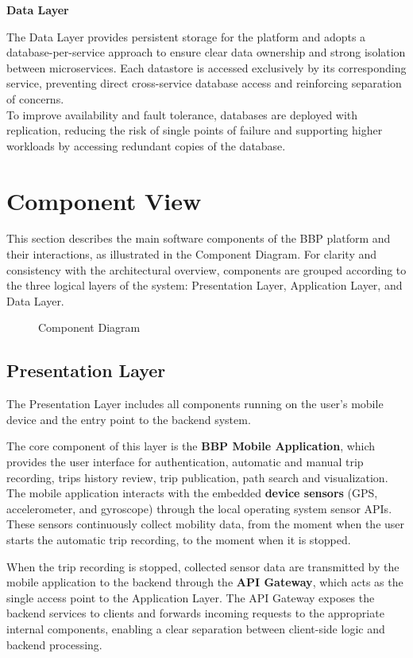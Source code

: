 \textbf{Data Layer}

The Data Layer provides persistent storage for the platform and adopts a database-per-service approach to ensure clear data ownership and strong isolation between microservices. Each datastore is accessed exclusively by its corresponding service, preventing direct cross-service database access and reinforcing separation of concerns. \\To improve availability and fault tolerance, databases are deployed with replication, reducing the risk of single points of failure and supporting higher workloads by accessing redundant copies of the database.


\section{Component View}
This section describes the main software components of the BBP platform and their interactions, as illustrated in the Component Diagram. For clarity and consistency with the architectural overview, components are grouped according to the three logical layers of the system: Presentation Layer, Application Layer, and Data Layer.


\begin{figure}[H]
    \centering
    
    \caption{Component Diagram}
    \label{fig: component_diagram}
\end{figure}


\subsection{Presentation Layer}
The Presentation Layer includes all components running on the user's mobile device and the entry point to the backend system.

The core component of this layer is the \textbf{BBP Mobile Application}, which provides the user interface for authentication, automatic and manual trip recording, trips history review, trip publication, path search and visualization. The mobile application interacts with the embedded \textbf{device sensors} (GPS, accelerometer, and gyroscope) through the local operating system sensor APIs. These sensors continuously collect mobility data, from the moment when the user starts the automatic trip recording, to the moment when it is stopped.

When the trip recording is stopped, collected sensor data are transmitted by the mobile application to the backend through the \textbf{API Gateway}, which acts as the single access point to the Application Layer. The API Gateway exposes the backend services to clients and forwards incoming requests to the appropriate internal components, enabling a clear separation between client-side logic and backend processing.

